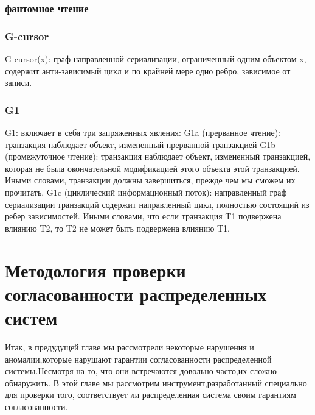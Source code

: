 \documentclass[12pt,  openany]{book}
\begin{document}
\subsection{фантомное чтение}
\subsection{G-cursor}
G-cursor(x): граф направленной сериализации, ограниченный одним объектом x, содержит анти-зависимый цикл и по крайней мере одно ребро, зависимое от записи.

\subsection{G1}
G1: включает в себя три запряженных явления: \newline
G1a (прерванное чтение): транзакция наблюдает объект, измененный прерванной транзакцией  \newline
G1b (промежуточное чтение): транзакция наблюдает объект, измененный транзакцией, которая не была окончательной модификацией этого объекта этой транзакцией. Иными словами, транзакции должны завершиться, прежде чем мы сможем их прочитать,  \newline
G1c (циклический информационный поток): направленный граф сериализации транзакций содержит направленный цикл, полностью состоящий из ребер зависимостей. Иными словами, что если транзакция T1 подвержена влиянию T2, то T2 не может быть подвержена влиянию T1.

\chapter{Методология проверки согласованности распределенных систем}
Итак, в предудущей главе мы рассмотрели некоторые нарушения и аномалии,которые нарушают гарантии согласованности распределенной системы.Несмотря на то, что они встречаются довольно часто,их сложно обнаружить.  В этой главе мы рассмотрим инструмент,разработанный специально для проверки того, соответствует ли распределенная система своим гарантиям согласованности.
\end{document}
